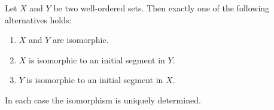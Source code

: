 Let $X$ and $Y$ be two well-ordered sets. Then exactly one of the following alternatives holds:

\begin{enumerate}
\item[(a)] $X$ and $Y$ are isomorphic.
\item[(b)] $X$ is isomorphic to an initial segment in $Y$.
\item[(c)] $Y$ is isomorphic to an initial segment in $X$.
\end{enumerate}

In each case the isomorphism is uniquely determined.
